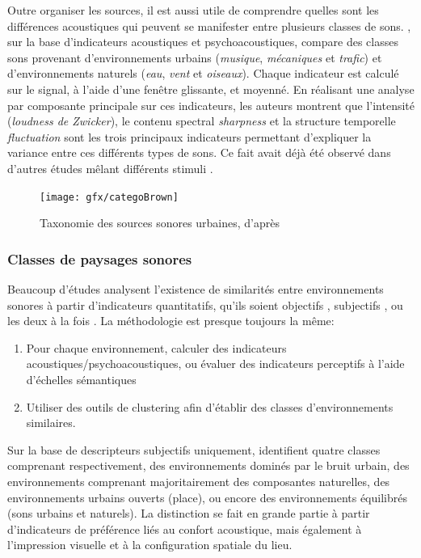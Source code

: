 Outre organiser les sources, il est aussi utile de comprendre quelles sont les différences acoustiques qui peuvent se manifester entre plusieurs classes de sons. \citep{yang2013psychoacoustical}, sur la base d'indicateurs acoustiques et psychoacoustiques, compare des classes sons provenant d'environnements urbains (\emph{musique}, \emph{mécaniques} et \emph{trafic}) et d'environnements naturels (\emph{eau}, \emph{vent} et \emph{oiseaux}). Chaque indicateur est calculé sur le signal, à l'aide d'une fenêtre glissante, et moyenné. En réalisant une analyse par composante principale sur ces indicateurs, les auteurs montrent que l'intensité (\emph{loudness  de Zwicker}), le contenu spectral \emph{sharpness} et la structure temporelle \emph{fluctuation} sont les trois principaux indicateurs permettant d'expliquer la variance entre ces différents types de sons. Ce fait avait déjà été observé dans d'autres études mêlant différents stimuli \citep{de2006quiet,botteldooren2006temporal}.


\begin{figure}[t]
        \myfloatalign
        \texttt{[image: gfx/categoBrown]}
        \caption{Taxonomie des sources sonores urbaines, d'après \citep{brown2011towards}}\label{fig:catSoundscapeBrown}
\end{figure}

\subsubsection{Classes de paysages sonores}
\label{sec:ch3_classePaysage}

Beaucoup d'études analysent l'existence de similarités entre environnements sonores à partir d'indicateurs quantitatifs, qu'ils soient objectifs \citep{rychtarikova2013soundscape}, subjectifs \citep{jeon2013soundwalk}, ou les deux à la fois \citep{torija2013application,ricciardi2015sound}. La méthodologie est presque toujours la même:

\begin{enumerate}
\item Pour chaque environnement, calculer des indicateurs acoustiques/psychoacoustiques, ou évaluer des indicateurs perceptifs à l'aide d'échelles sémantiques
\item Utiliser des outils de clustering afin d'établir des classes d'environnements similaires.
\end{enumerate}

Sur la base de descripteurs subjectifs uniquement, \citep{jeon2013soundwalk} identifient quatre classes comprenant respectivement, des environnements dominés par le bruit urbain, des environnements comprenant majoritairement des composantes naturelles, des environnements urbains ouverts (place), ou encore des environnements équilibrés (sons urbains et naturels). La distinction se fait en grande partie à partir d'indicateurs de préférence liés au confort acoustique, mais également à l'impression visuelle et à la configuration spatiale du lieu.  

